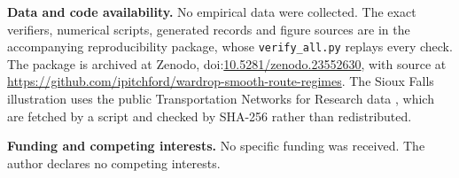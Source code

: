 \documentclass[11pt,a4paper]{article}
\theoremstyle{definition}
\theoremstyle{remark}
\begin{document}
\textbf{Data and code availability.} No empirical data were collected. The exact verifiers, numerical scripts, generated records and figure sources are in the accompanying reproducibility package, whose \texttt{verify\_all.py} replays every check. The package is archived at Zenodo, doi:\href{https://doi.org/10.5281/zenodo.23552630}{10.5281/zenodo.23552630}, with source at \url{https://github.com/ipitchford/wardrop-smooth-route-regimes}. The Sioux Falls illustration uses the public Transportation Networks for Research data \cite{TNTP,LeBlanc1975}, which are fetched by a script and checked by SHA-256 rather than redistributed.

\textbf{Funding and competing interests.} No specific funding was received. The author declares no competing interests.

\appendix





\small

\end{document}
